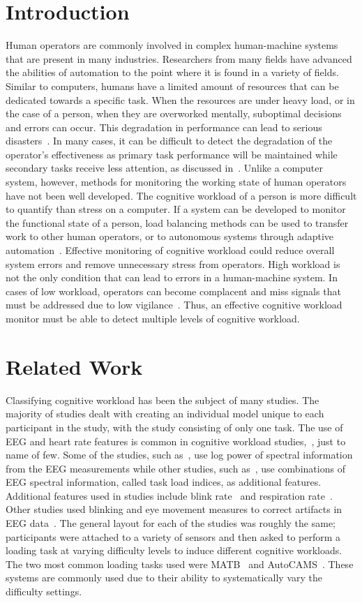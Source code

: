 \documentclass[11pt]{article}
\begin{document}
\section{Introduction}
Human operators are commonly involved in complex human-machine systems that are present in many industries. Researchers from many fields have advanced the abilities of automation to the point where it is found in a variety of fields. Similar to computers, humans have a limited amount of resources that can be dedicated towards a specific task. When the resources are under heavy load, or in the case of a person, when they are overworked mentally, suboptimal decisions and errors can occur. This degradation in performance can lead to serious disasters~\cite{Wickens}. In many cases, it can be difficult to detect the degradation of the operator's effectiveness as primary task performance will be maintained while secondary tasks receive less attention, as discussed in~\cite{Hockey}.  Unlike a computer system, however, methods for monitoring the working state of human operators have not been well developed. The cognitive workload of a person is more difficult to quantify than stress on a computer. If a system can be developed to monitor the functional state of a person, load balancing methods can be used to transfer work to other human operators, or to autonomous systems through adaptive automation~\cite{Wilson}. Effective monitoring of cognitive workload could reduce overall system errors and remove unnecessary stress from operators. High workload is not the only condition that can lead to errors in a human-machine system. In cases of low workload, operators can become complacent and miss signals that must be addressed due to low vigilance~\cite{Parasuraman}. Thus, an effective cognitive workload monitor must be able to detect multiple levels of cognitive workload.

\section{Related Work}
Classifying cognitive workload has been the subject of many studies. The majority of studies dealt with creating an individual model unique to each participant in the study, with the study consisting of only one task. The use of EEG and heart rate features is common in cognitive workload studies,~\cite{Wang_R, Zhang, Wilson, Yang}, just to name of few. Some of the studies, such as~\cite{Wilson}, use log power of spectral information from the EEG measurements while other studies, such as~\cite{Zhang}, use combinations of EEG spectral information, called task load indices, as additional features. Additional features used in studies include blink rate~\cite{Wilson, Wilson_2002} and respiration rate~\cite{Wilson_2003}. Other studies used blinking and eye movement measures to correct artifacts in EEG data~\cite{Wang_R}. The general layout for each of the studies was roughly the same; participants were attached to a variety of sensors and then asked to perform a loading task at varying difficulty levels to induce different cognitive workloads. The two most common loading tasks used were MATB~\cite{Estepp} and AutoCAMS~\cite{Lorenz}. These systems are commonly used due to their ability to systematically vary the difficulty settings. 
\end{document}
